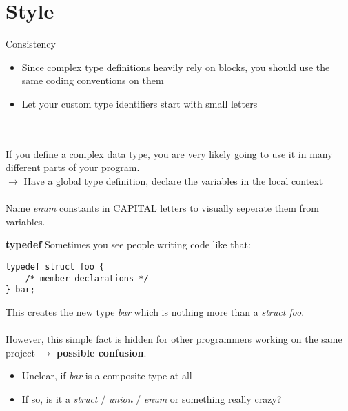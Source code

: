 \section{Style}
\begin{frame}{Consistency}
	\begin{itemize}
		\item Since complex type definitions heavily rely on blocks, you should use the same coding conventions on them
		\item Let your custom type identifiers start with small letters
	\end{itemize} \ \\ \ \\
	If you define a complex data type, you are very likely going to use it in many different parts of your program. \\
	$\rightarrow$ Have a global type definition, declare the variables in the local context \\ \ \\
	Name \textit{enum} constants in CAPITAL letters to visually seperate them from variables.
\end{frame}


\begin{frame}[fragile]{\textbf{typedef}}
	Sometimes you see people writing code like that:
	\begin{lstlisting}[numbers=none]
typedef struct foo {
	/* member declarations */
} bar;
\end{lstlisting}
	This creates the new type \textit{bar} which is nothing more than a \textit{struct foo}. \\ \ \\
	However, this simple fact is hidden for other programmers working on the same project $\rightarrow$ \textbf{possible confusion}.
	\begin{itemize}
		\item Unclear, if \textit{bar} is a composite type at all
		\item If so, is it a \textit{struct} / \textit{union} / \textit{enum} or something really crazy?
	\end{itemize}
\end{frame}

